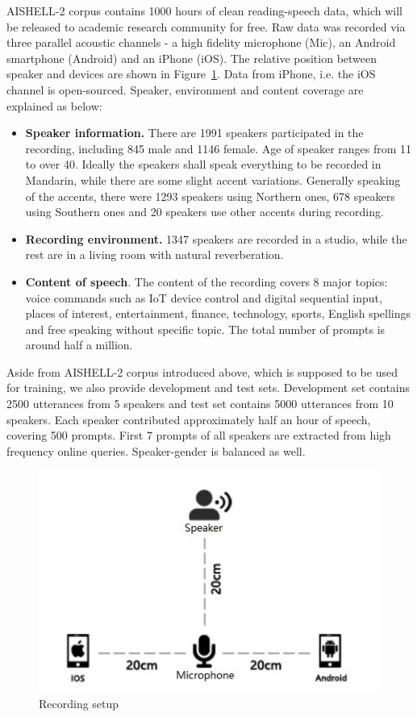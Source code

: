 \documentclass[a4paper]{article}
\begin{document}
AISHELL-2 corpus contains 1000 hours of clean reading-speech data, which will be released to academic research community for free. Raw data was recorded via three parallel acoustic channels - a high fidelity microphone (Mic), an Android smartphone (Android) and an iPhone (iOS). The relative position between speaker and devices are shown in Figure~\ref{fig:setup}. Data from iPhone, i.e. the iOS channel is open-sourced. Speaker, environment and content coverage are explained as below:
\begin{itemize}
\item \textbf{Speaker information.} There are 1991 speakers participated in the recording, including 845 male and 1146 female. Age of speaker ranges from 11 to over 40. Ideally the speakers shall speak everything to be recorded in Mandarin, while there are some slight accent variations. Generally speaking of the accents, there were 1293 speakers using Northern ones, 678 speakers using Southern ones and 20 speakers use other accents during recording. 
\item \textbf{Recording environment.} 1347 speakers are recorded in a studio, while the rest are in a living room with natural reverberation.
\item \textbf{Content of speech}. The content of the recording covers 8 major topics: voice commands such as IoT device control and digital sequential input, places of interest, entertainment, finance, technology, sports, English spellings and free speaking without specific topic. The total number of prompts is around half a million.
\end{itemize}

\noindent Aside from AISHELL-2 corpus introduced above, which is supposed to be used for training, 
we also provide development and test sets. 
Development set contains 2500 utterances from 5 speakers and test set contains 5000 utterances from 10 speakers. 
Each speaker contributed approximately half an hour of speech, covering 500 prompts. 
First 7 prompts of all speakers are extracted from high frequency online queries. Speaker-gender is balanced as well.

\begin{figure}[h]
  \centering
  \includegraphics[width=\linewidth]{setup.jpg}
  \caption{Recording setup}
  \label{fig:setup}
\end{figure}
\end{document}
